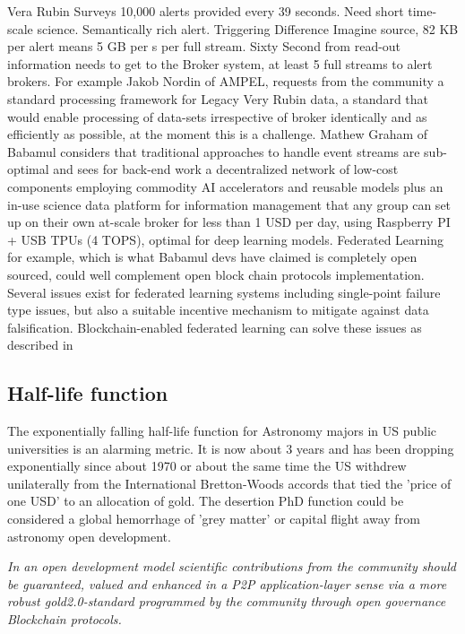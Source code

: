 \documentclass[final,5p,times,twocolumn,authoryear]{elsarticle}
\begin{document}
Vera Rubin Surveys 10,000 alerts provided every 39 seconds. Need short time-scale science. Semantically rich alert. Triggering Difference Imagine source, 82 KB per alert means 5 GB per s per full stream. Sixty Second from read-out information needs to get to the Broker system, at least 5 full streams to alert brokers.   For example  Jakob Nordin of AMPEL, requests from the community a standard processing framework for Legacy Very Rubin data, a standard that would enable processing of data-sets irrespective of broker identically and as efficiently as possible, at the moment this is a challenge.  Mathew Graham of Babamul considers that traditional approaches to handle event streams are sub-optimal and sees for back-end work a decentralized network of low-cost components employing commodity AI accelerators and reusable models plus an in-use science data platform for information management that any group can set up on their own at-scale broker for less than 1 USD per day, using Raspberry PI + USB TPUs (4 TOPS), optimal for deep learning models.  Federated Learning for example, which is what Babamul devs have claimed is completely open sourced, could well complement open block chain protocols implementation. Several issues exist for federated learning systems including single-point failure type issues, but also a suitable incentive mechanism to mitigate against data falsification. Blockchain-enabled federated learning can solve these issues as described in 


\subsection{Half-life function}
\label{btc2:sec:sub:half}

The exponentially falling half-life function for Astronomy majors in US public universities is an alarming metric. It is now about 3 years and has been dropping exponentially since about 1970 or about the same time the US withdrew unilaterally from the International Bretton-Woods accords that tied the 'price of one USD' to an allocation of gold. The desertion PhD function could be considered a global hemorrhage of 'grey matter' or capital flight away from astronomy open development.

\emph{In an open development model scientific contributions from the community should be guaranteed, valued and enhanced in a P2P application-layer sense via a more robust gold2.0-standard programmed by the community through open governance Blockchain protocols.}
\end{document}
